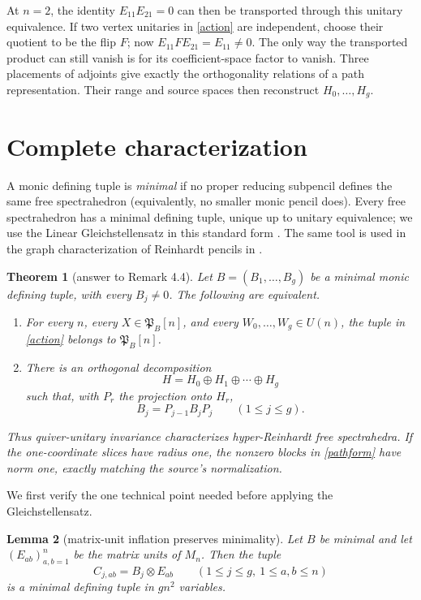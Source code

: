 \documentclass[11pt]{article}
\newtheorem{theorem}{Theorem}
\newtheorem{lemma}[theorem]{Lemma}
\newcommand{\Pfr}{\mathfrak P}
\begin{document}
At $n=2$, the identity $E_{11}E_{21}=0$ can then be transported through this
unitary equivalence.  If two vertex unitaries in \eqref{action} are
independent, choose their quotient to be the flip $F$; now
$E_{11}FE_{21}=E_{11}\ne0$.  The only way the transported product can still
vanish is for its coefficient-space factor to vanish.  Three placements of
adjoints give exactly the orthogonality relations of a path representation.
Their range and source spaces then reconstruct $H_0,\ldots,H_g$.

\section{Complete characterization}

A monic defining tuple is \emph{minimal} if no proper reducing subpencil
defines the same free spectrahedron (equivalently, no smaller monic pencil
does).  Every free spectrahedron has a minimal defining
tuple, unique up to unitary equivalence; we use the Linear Gleichstellensatz
in this standard form \cite[Proposition 2.2]{EHKM}.  The same tool is used in
the graph characterization of Reinhardt pencils in \cite[Theorem 3.1]{MT}.

\begin{theorem}[answer to Remark 4.4]\label{main}
Let $B=(B_1,\ldots,B_g)$ be a minimal monic defining tuple, with every
$B_j\ne0$.  The following are equivalent.
\begin{enumerate}
\item For every $n$, every $X\in\Pfr_B[n]$, and every
$W_0,\ldots,W_g\in U(n)$, the tuple in \eqref{action} belongs to
$\Pfr_B[n]$.
\item There is an orthogonal decomposition
\[
 H=H_0\oplus H_1\oplus\cdots\oplus H_g
\]
such that, with $P_r$ the projection onto $H_r$,
\begin{equation}\label{pathform}
 B_j=P_{j-1}B_jP_j\qquad(1\le j\le g).
\end{equation}
\end{enumerate}
Thus quiver-unitary invariance characterizes hyper-Reinhardt free
spectrahedra.  If the one-coordinate slices have radius one, the nonzero
blocks in \eqref{pathform} have norm one, exactly matching the source's
normalization.
\end{theorem}

We first verify the one technical point needed before applying the
Gleichstellensatz.

\begin{lemma}[matrix-unit inflation preserves minimality]\label{inflation}
Let $B$ be minimal and let $(E_{ab})_{a,b=1}^n$ be the matrix units of $M_n$.
Then the tuple
\[
 C_{j,ab}=B_j\otimes E_{ab}\qquad
 (1\le j\le g,\ 1\le a,b\le n)
\]
is a minimal defining tuple in $gn^2$ variables.
\end{lemma}
\end{document}
